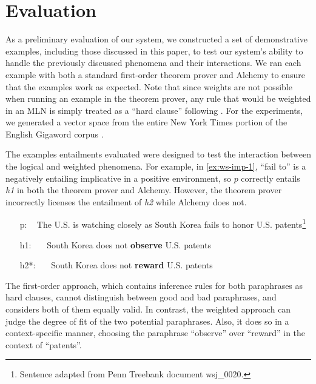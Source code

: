\section{Evaluation}

As a preliminary evaluation of our system, we constructed a set of demonstrative
examples, including those discussed in this paper, to test our system's ability
to handle the previously discussed phenomena and their interactions.  We ran
each example with both a standard first-order theorem prover and Alchemy to
ensure that the examples work as expected. Note that since weights are not
possible when running an example in the theorem prover, any rule that would be
weighted in an MLN is simply treated as a ``hard clause'' following
\citet{bos:emnlp2005}.  For the experiments, we generated a vector space from
the entire New York Times portion of the English Gigaword corpus
\citep{graff:gigaword2003}.

The examples entailments evaluated were designed to test the interaction between
the logical and weighted phenomena.  For example, in \eqref{ex:ws-imp-1}, ``fail
to'' is a negatively entailing implicative in a positive environment, so $p$
correctly entails {\it h1} in both the theorem prover and Alchemy.
However, the theorem prover incorrectly licenses the entailment of {\it h2}
while Alchemy does not.
\begin{covex}\label{ex:ws-imp-1}
\begin{itemize}
  \item[p:]~    The U.S. is watching closely as South Korea fails to honor
  U.S. patents\footnote{Sentence adapted from Penn Treebank document wsj\_0020.}
  \item[h1:]~~~South Korea does not {\bf observe} U.S. patents
  \item[h2*:]~~~South Korea does not {\bf reward} U.S. patents
\end{itemize}
\end{covex}
The first-order approach, which contains inference rules for both
paraphrases as hard clauses, cannot distinguish between
good and bad paraphrases, and considers both of them equally valid. In
contrast, the weighted approach can judge the degree of fit of the two potential
paraphrases. Also, it does so in a context-specific manner, choosing
the paraphrase ``observe'' over ``reward'' in the context of
``patents''. 

